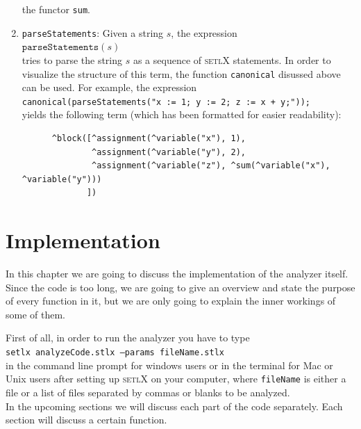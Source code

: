 \documentclass[11pt]{report}
\begin{document}
\begin{enumerate}
      the functor \texttt{sum}.
\item \texttt{parseStatements}:  Given a string $s$, the expression
      \\[0.2cm]
      \hspace*{1.3cm}
      $\mathtt{parseStatements}(s)$ 
      \\[0.2cm]
      tries to parse the string $s$ as a sequence of \textsc{setlX} statements.   In order to visualize the structure of
      this term,  the function \texttt{canonical} disussed above can be used.  For example, the expression
      \\[0.2cm]
      \hspace*{1.3cm}
      \texttt{canonical(parseStatements("x := 1; y := 2; z := x + y;"));}
      \\[0.2cm]
      yields the following term (which has been formatted for easier readability):
\begin{verbatim}
      ^block([^assignment(^variable("x"), 1), 
              ^assignment(^variable("y"), 2), 
              ^assignment(^variable("z"), ^sum(^variable("x"), ^variable("y")))
             ])
\end{verbatim}
\end{enumerate}

\chapter{Implementation}

In this chapter we are going to discuss the implementation of the analyzer itself. Since the code is too long, we are going to give an overview and state the purpose of every function in it, but we are only going to explain the inner workings of some of them. 

First of all, in order to run the analyzer you have to type
\\[0.2cm]
\hspace*{1.3cm}
\texttt{setlx analyzeCode.stlx --params fileName.stlx}
\\[0.2cm]
in the command line prompt for windows users or in the terminal for Mac or Unix users after setting up \textsc{setlX} on your computer, where \texttt{fileName} is either a file or a list of files separated by commas or blanks to be analyzed.
\\

In the upcoming sections we will discuss each part of the code separately. Each section will discuss a certain function.
\end{document}
